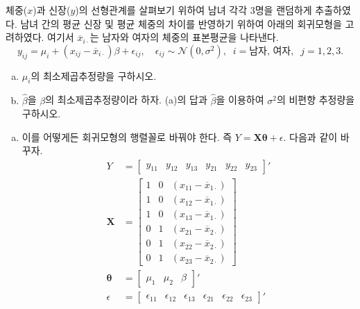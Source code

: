 \documentclass[answers]{exam}
\newcommand{\bs}{\boldsymbol}
\begin{document}
\begin{questions}
\begin{solution}
\begin{enumerate}[(a)]
    \end{enumerate}
   \end{solution}
   \question
   체중($x$)과 신장($y$)의 선형관계를 살펴보기 위하여 남녀 각각 $3$명을 랜덤하게 추출하였다. 남녀 간의 평균 신장 및 평균 체중의 차이를 반영하기 위하여 아래의 회귀모형을 고려하였다. 여기서 $\overline{x}_{i\cdot}$는 남자와 여자의 체중의 표본평균을 나타낸다.
   $$
    y_{ij}=\mu_{i}+\left(x_{ij}-\overline{x}_{i\cdot}\right)\beta+\epsilon_{ij},\quad \epsilon_{ij}\sim\mathcal{N}\left(0,\sigma^{2}\right),\;\; i=\text{남자, 여자},\;\;j=1,2,3.
   $$
   \begin{enumerate}[(a)]
    \item $\mu_{i}$의 최소제곱추정량을 구하시오.
    \item $\widehat{\beta}$을 $\beta$의 최소제곱추정량이라 하자. (a)의 답과 $\widehat{\beta}$을 이용하여 $\sigma^{2}$의 비편향 추정량을 구하시오.
   \end{enumerate}
   \begin{solution}
    \begin{enumerate}[(a)]
      \item 이를 어떻게든 회귀모형의 행렬꼴로 바꿔야 한다. 즉 $Y=\mathbf{X}\bs{\theta}+\epsilon$. 다음과 같이 바꾸자.
      \begin{align}
        Y &= \begin{bmatrix}y_{11}&y_{12}&y_{13}&y_{21}&y_{22}&y_{23}\end{bmatrix}'\\
        \mathbf{X} &= \begin{bmatrix}1 & 0 & \left(x_{11}-\overline{x}_{1\cdot}\right)\\1 & 0 & \left(x_{12}-\overline{x}_{1\cdot}\right)\\1 & 0 & \left(x_{13}-\overline{x}_{1\cdot}\right)\\ 0 & 1 & \left(x_{21}-\overline{x}_{2\cdot}\right)\\0 & 1 & \left(x_{22}-\overline{x}_{2\cdot}\right)\\0 & 1 & \left(x_{23}-\overline{x}_{2\cdot}\right)  \end{bmatrix}\\ 
        \bs{\theta} &= \begin{bmatrix}\mu_{1}&\mu_{2}&\beta \end{bmatrix}'\\
        \epsilon &= \begin{bmatrix}\epsilon_{11} &\epsilon_{12}&\epsilon_{13}&\epsilon_{21}&\epsilon_{22}&\epsilon_{23} \end{bmatrix}'

\end{align}
\end{enumerate}
\end{solution}
\end{questions}
\end{document}
